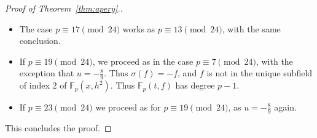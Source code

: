 \documentclass[10pt,a4paper]{amsart}
\newcommand{\F}{\mathbb{F}}
\begin{document}
\begin{proof}[Proof of Theorem~\ref{thm:apery}.]
\begin{itemize}
        \item The case $p\equiv 17 \pmod{24}$ works as $p\equiv 13 \pmod{24}$, with the same conclusion.
        \item If $p\equiv 19 \pmod{24}$, we proceed as in the case $p\equiv 7 \pmod{24}$, with the exception that $u=-\frac 8 9$. Thus $\sigma(f)=-f$, and $f$ is not in the unique subfield of index $2$ of $\F_p(x, h^2)$. Thus $\F_p(t, f)$ has degree $p{-}1$.
        \item If $p\equiv 23 \pmod{24}$ we proceed as for $p\equiv 19 \pmod{24}$, as $u=-\frac 8 9$ again.
    \end{itemize}
This concludes the proof.
\end{proof}
\end{document}
